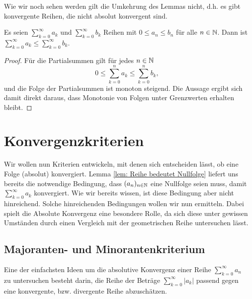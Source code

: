 \documentclass[a4paper,10pt]{article}
\begin{document}
Wie wir noch sehen werden gilt die Umkehrung des Lemmas nicht, d.h. es gibt konvergente Reihen, die nicht absolut konvergent sind.


\begin{lem}
 Es seien $\sum_{k=0}^\infty a_k$ und $\sum_{k=0}^\infty b_k$ Reihen mit $0 \leq a_n \leq b_n$ für alle $n \in \mathbb{N}$. Dann ist $\sum_{k=0}^\infty a_k \leq \sum_{k=0}^\infty b_k$.
\end{lem}
\begin{proof}
 Für die Partialsummen gilt für jedes $n \in \mathbb{N}$
 \[
  0 \leq \sum_{k=0}^n a_k \leq \sum_{k=0}^n b_k,
 \]
 und die Folge der Partialsummen ist monoton steigend. Die Aussage ergibt sich damit direkt daraus, dass Monotonie von Folgen unter Grenzwerten erhalten bleibt.
\end{proof}





\section{Konvergenzkriterien}


Wir wollen nun Kriterien entwickeln, mit denen sich entscheiden lässt, ob eine Folge (absolut) konvergiert. Lemma \ref{lem: Reihe bedeutet Nullfolge} liefert uns bereits die notwendige Bedingung, dass $(a_n)_{n \in \mathbb{N}}$ eine Nullfolge seien muss, damit $\sum_{k=0}^\infty a_k$ konvergiert. Wie wir bereits wissen, ist diese Bedingung aber nicht hinreichend. Solche hinreichenden Bedingungen wollen wir nun ermitteln. Dabei spielt die Absolute Konvergenz eine besondere Rolle, da sich diese unter gewissen Umständen durch einen Vergleich mit der geometrischen Reihe untersuchen lässt.


\subsection{Majoranten- und Minorantenkriterium}

Eine der einfachsten Ideen um die absolutive Konvergenz einer Reihe $\sum_{k=0}^\infty a_n$ zu untersuchen besteht darin, die Reihe der Beträge $\sum_{k=0}^\infty |a_k|$ passend gegen eine konvergente, bzw. divergente Reihe abzuschätzen.
\end{document}

